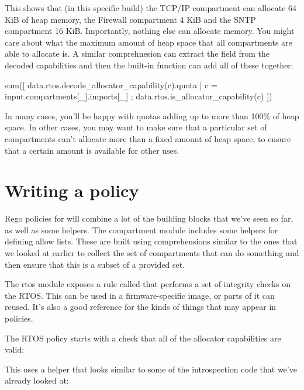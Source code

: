 {This shows that (in this specific build) the TCP/IP compartment can allocate 64 KiB of heap memory, the Firewall compartment 4 KiB and the SNTP compartment 16 KiB.
Importantly, nothing else can allocate memory.
You might care about what the maximum amount of heap space that all compartments are able to allocate is.
A similar comprehnesion can extract the  field from the decoded capabilities and then the built-in  function can add all of these together:

\begin{regosnippet}
sum([ data.rtos.decode_allocator_capability(c).quota |
    c = input.compartments[_].imports[_] ;
    data.rtos.is_allocator_capability(c) ])
\end{regosnippet}

In many cases, you'll be happy with quotas adding up to more than 100\% of heap space.
In other cases, you may want to make sure that a particular set of compartments can't allocate more than a fixed amount of heap space, to ensure that a certain amount is available for other uses.

\section{Writing a policy}

Rego policies for  will combine a lot of the building blocks that we've seen so far, as well as some helpers.
The compartment module includes some helpers for defining allow lists.
These are built using comprehensions similar to the ones that we looked at earlier to collect the set of compartments that can do something and then ensure that this is a subset of a provided set.

The rtos module exposes a rule called  that performs a set of integrity checks on the RTOS.
This can be used in a firmware-specific image, or parts of it can reused.
It's also a good reference for the kinds of things that may appear in policies.

The RTOS policy starts with a check that all of the allocator capabilities are valid:

\regolisting[filename=examples/auditing-rtos/rtos.rego,marker=allsealedvalid,label=lst:allsealedvalid,caption="The Rego expression checking that all sealed allocator capabilities are valid"]{}

This uses a helper that looks similar to some of the introspection code that we've already looked at:

}
